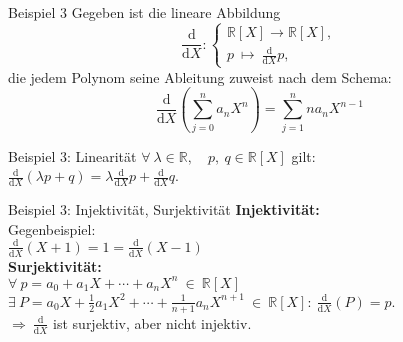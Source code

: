 \documentclass[AERbeamer%
,optBeamerClassicFormat%
,optLeftEquations   %
]{AERlatex}
\begin{document}
%
    \begin{frame}{Beispiel 3}
        Gegeben ist die lineare Abbildung
        \begin{equation*}
            \frac{\mathrm{d}}{\mathrm{d} X}:\left\{\begin{array}{l}
                                                       \mathbb{R}[X] \rightarrow \mathbb{R}[X], \\
                                                       p ~ \mapsto ~ \frac{\mathrm{d}}{\mathrm{d} X} p,
            \end{array}\right.
        \end{equation*}
        die jedem Polynom seine Ableitung zuweist nach dem Schema: \\
        \begin{equation*}
            \frac{\mathrm{d}}{\mathrm{d} X}\left(\sum_{j=0}^n a_n X^n\right)=\sum_{j=1}^n n a_n X^{n-1}
        \end{equation*}
    \end{frame}
%
    \begin{frame}{Beispiel 3: Linearität}
        \setlength{\baselineskip}{1.6\baselineskip}
        $\forall ~ \lambda \in \mathbb{R}, \quad p,~ q \in \mathbb{R}[X]$ gilt: \\
        $\frac{\mathrm{d}}{\mathrm{d} X}(\lambda p+q)=\lambda \frac{\mathrm{d}}{\mathrm{d} X} p+\frac{\mathrm{d}}{\mathrm{d} X} q$.
    \end{frame}
%
    \begin{frame}{Beispiel 3: Injektivität, Surjektivität}
        \setlength{\baselineskip}{1.6\baselineskip}
        \textbf{Injektivität:} \\
        Gegenbeispiel: \\
        $\frac{\mathrm{d}}{\mathrm{d} X}(X+1)=1=\frac{\mathrm{d}}{\mathrm{d} X}(X-1)$ \\ \pause
        \vspace{1em}
        \textbf{Surjektivität:} \\
        $\forall ~ p=a_0+a_1 X+\cdots+a_n X^n ~ \in ~ \mathbb{R}[X]$ \\
        $\exists ~ P=a_0 X+\frac{1}{2} a_1 X^2+\cdots+\frac{1}{n+1} a_n X^{n+1} ~ \in ~ \mathbb{R}[X]: ~ \frac{\mathrm{d}}{\mathrm{d} X} (P) = p$. \\ \pause
        $\Rightarrow ~ \frac{\mathrm{d}}{\mathrm{d} X}$ ist surjektiv, aber nicht injektiv.
    \end{frame}
%
\end{document}
